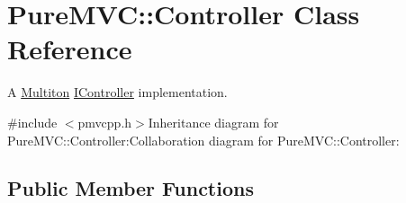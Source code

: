 \hypertarget{class_pure_m_v_c_1_1_controller}{
\section{PureMVC::Controller Class Reference}
\label{class_pure_m_v_c_1_1_controller}
}


A \hyperlink{class_pure_m_v_c_1_1_multiton}{Multiton} {\ttfamily \hyperlink{class_pure_m_v_c_1_1_i_controller}{IController}} implementation.  


{\ttfamily \#include $<$pmvcpp.h$>$}Inheritance diagram for PureMVC::Controller:Collaboration diagram for PureMVC::Controller:\subsection*{Public Member Functions}
